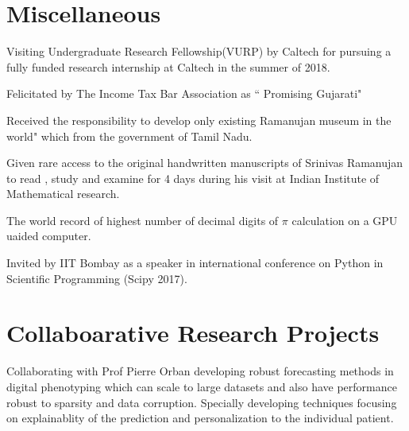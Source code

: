 \documentclass[]{deedy-resume-openfont}
\begin{document}
\sectionsep



\section{Miscellaneous}
\hline
\vspace{\topsep}

\begin{tightemize}
\item Visiting Undergraduate Research Fellowship(VURP) by Caltech for pursuing a fully funded research internship at Caltech in the summer of 2018. 
\item Felicitated by The Income Tax Bar Association as “ Promising Gujarati"
\item Received the responsibility to develop \The only existing Ramanujan museum
in the world" which from the government of Tamil Nadu.
\item Given rare access to the original handwritten manuscripts of Srinivas Ramanujan to read , study and examine for 4 days during his visit at Indian Institute of Mathematical research.
\item The world record of highest number of decimal digits of $\pi$ calculation on a GPU uaided computer. 
\item Invited by IIT Bombay as a speaker in international conference on Python in Scientific Programming (Scipy 2017).
\end{tightemize}
\sectionsep








\section{Collaboarative Research Projects}
\hline
\vspace{\topsep}
Collaborating with Prof Pierre Orban developing robust forecasting methods in digital phenotyping which can scale to large datasets and also have  performance robust to sparsity and data corruption. Specially developing techniques focusing on explainablity of the prediction and personalization to the individual patient. 
\sectionsep
\end{document}
